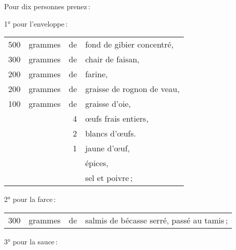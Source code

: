 Pour dix personnes prenez :

\medskip

1° pour l'enveloppe :

\footnotesize
\begin{longtable}{rrrp{16em}}
    500 & grammes & de & fond de gibier concentré,                                                        \\
    300 & grammes & de & chair de faisan,                                                                 \\
    200 & grammes & de & farine,                                                                          \\
    200 & grammes & de & graisse de rognon de veau,                                                       \\
    100 & grammes & de & graisse d'oie,                                                                   \\
        &         &  4 & œufs frais entiers,                                                              \\
        &         &  2 & blancs d'œufs.                                                                   \\
        &         &  1 & jaune d'œuf,                                                                     \\
        &         &    & épices,                                                                          \\
        &         &    & sel et poivre ;                                                                  \\
\end{longtable}
\normalsize

2° pour la farce :

\footnotesize
\begin{longtable}{rrrp{16em}}
    300 & grammes & de & salmis de bécasse serré, passé au tamis ;                                        \\
\end{longtable}
\normalsize

3° pour la sauce :

